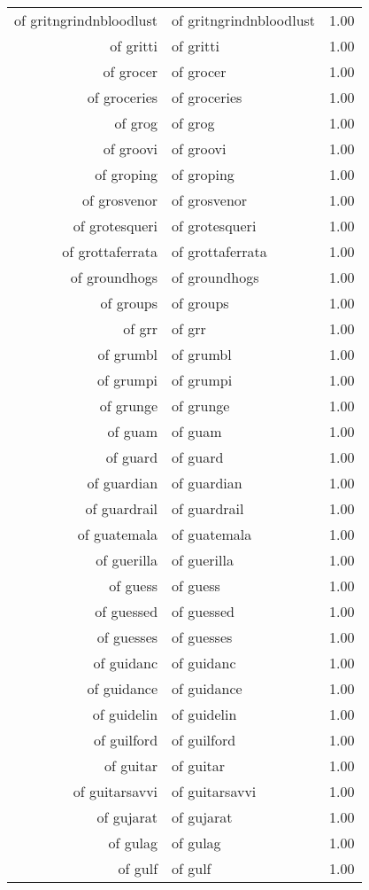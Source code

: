 \begin{table}[ht]
\begin{tabular}{rlr}
  of gritngrindnbloodlust & of gritngrindnbloodlust & 1.00 \\ 
  of gritti & of gritti & 1.00 \\ 
  of grocer & of grocer & 1.00 \\ 
  of groceries & of groceries & 1.00 \\ 
  of grog & of grog & 1.00 \\ 
  of groovi & of groovi & 1.00 \\ 
  of groping & of groping & 1.00 \\ 
  of grosvenor & of grosvenor & 1.00 \\ 
  of grotesqueri & of grotesqueri & 1.00 \\ 
  of grottaferrata & of grottaferrata & 1.00 \\ 
  of groundhogs & of groundhogs & 1.00 \\ 
  of groups & of groups & 1.00 \\ 
  of grr & of grr & 1.00 \\ 
  of grumbl & of grumbl & 1.00 \\ 
  of grumpi & of grumpi & 1.00 \\ 
  of grunge & of grunge & 1.00 \\ 
  of guam & of guam & 1.00 \\ 
  of guard & of guard & 1.00 \\ 
  of guardian & of guardian & 1.00 \\ 
  of guardrail & of guardrail & 1.00 \\ 
  of guatemala & of guatemala & 1.00 \\ 
  of guerilla & of guerilla & 1.00 \\ 
  of guess & of guess & 1.00 \\ 
  of guessed & of guessed & 1.00 \\ 
  of guesses & of guesses & 1.00 \\ 
  of guidanc & of guidanc & 1.00 \\ 
  of guidance & of guidance & 1.00 \\ 
  of guidelin & of guidelin & 1.00 \\ 
  of guilford & of guilford & 1.00 \\ 
  of guitar & of guitar & 1.00 \\ 
  of guitarsavvi & of guitarsavvi & 1.00 \\ 
  of gujarat & of gujarat & 1.00 \\ 
  of gulag & of gulag & 1.00 \\ 
  of gulf & of gulf & 1.00 \\ 

\end{tabular}
\end{table}
